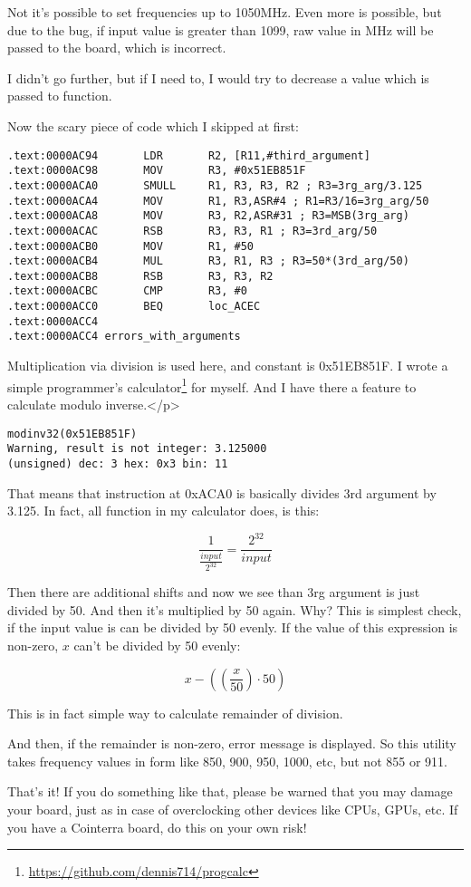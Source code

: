 Not it's possible to set frequencies up to 1050MHz. Even more is possible, but due to the bug, if input value is greater than 1099, raw value in MHz will be passed to the board, which is incorrect.

I didn't go further, but if I need to, I would try to decrease a value which is passed to  function.

Now the scary piece of code which I skipped at first:

\begin{lstlisting}
.text:0000AC94       LDR       R2, [R11,#third_argument]
.text:0000AC98       MOV       R3, #0x51EB851F
.text:0000ACA0       SMULL     R1, R3, R3, R2 ; R3=3rg_arg/3.125
.text:0000ACA4       MOV       R1, R3,ASR#4 ; R1=R3/16=3rg_arg/50
.text:0000ACA8       MOV       R3, R2,ASR#31 ; R3=MSB(3rg_arg)
.text:0000ACAC       RSB       R3, R3, R1 ; R3=3rd_arg/50
.text:0000ACB0       MOV       R1, #50
.text:0000ACB4       MUL       R3, R1, R3 ; R3=50*(3rd_arg/50)
.text:0000ACB8       RSB       R3, R3, R2
.text:0000ACBC       CMP       R3, #0
.text:0000ACC0       BEQ       loc_ACEC
.text:0000ACC4
.text:0000ACC4 errors_with_arguments
\end{lstlisting}

Multiplication via division is used here, and constant is 0x51EB851F.
I wrote a simple programmer's calculator\footnote{\url{https://github.com/dennis714/progcalc}} for myself.
And I have there a feature to calculate modulo inverse.</p>

\begin{lstlisting}
modinv32(0x51EB851F)
Warning, result is not integer: 3.125000
(unsigned) dec: 3 hex: 0x3 bin: 11
\end{lstlisting}

That means that  instruction at 0xACA0 is basically divides 3rd argument by 3.125.
In fact, all  function in my calculator does, is this:

\[
\frac{1}{\frac{input}{2^{32}}} = \frac{2^{32}}{input}
\]

Then there are additional shifts and now we see than 3rg argument is just divided by 50.
And then it's multiplied by 50 again.
Why?
This is simplest check, if the input value is can be divided by 50 evenly.
If the value of this expression is non-zero, $x$ can't be divided by 50 evenly:

\[
x-((\frac{x}{50}) \cdot 50)
\]

This is in fact simple way to calculate remainder of division.

And then, if the remainder is non-zero, error message is displayed. So this utility takes frequency values in form like 850, 900, 950, 1000, etc, but not 855 or 911.

That's it! If you do something like that, please be warned that you may damage your board, just as in case of overclocking other devices like CPUs, GPUs, etc.
If you have a Cointerra board, do this on your own risk!

